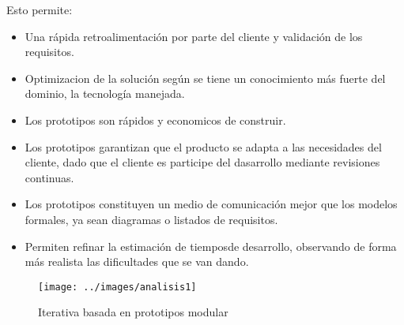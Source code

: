 Esto permite:

\begin{itemize}
	\item Una rápida retroalimentación por parte del cliente y validación de los requisitos. 
	\item Optimizacion de la solución según se tiene un conocimiento más fuerte del dominio, la tecnología manejada.
	\item Los prototipos son rápidos y economicos de construir.
	\item Los prototipos garantizan que el producto se adapta a las necesidades del cliente, dado que el cliente es participe del dasarrollo mediante revisiones continuas. 
	\item Los prototipos constituyen un medio de comunicación mejor que los modelos formales, ya sean diagramas o listados de requisitos. 
	\item Permiten refinar la estimación de tiemposde desarrollo, observando de forma más realista las dificultades que se van dando.  
	
\end{itemize}

\begin{figure}[h]
	\centering
	\texttt{[image: ../images/analisis1]}
	\caption[Iterativa basada en prototipos modular]{Iterativa basada en prototipos modular}
	\label{fig:}
\end{figure}
\newpage
